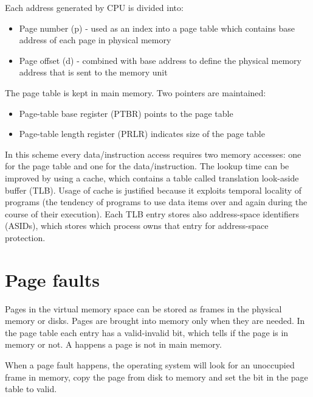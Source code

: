 
Each address generated by CPU is divided into:
\begin{itemize}
    \item Page number (p) - used as an index into a page table which contains base address of each page in physical memory
    \item Page offset (d) - combined with base address to define the physical memory address that is sent to the memory unit
\end{itemize}


The page table is kept in main memory. Two pointers are maintained:
\begin{itemize}
    \item Page-table base register (PTBR) points to the page table
    \item Page-table length register (PRLR) indicates size of the page table
\end{itemize}
In this scheme every data/instruction access requires two memory accesses: one for the page table and one for the data/instruction. The lookup time can be improved by using a cache, which contains a table called translation look-aside buffer (TLB). Usage of cache is justified because it exploits temporal locality of programs (the tendency of programs to use data items over and again during the course of their execution). Each TLB entry stores also address-space identifiers (ASIDs), which stores which process owns that entry for address-space protection.


\section{Page faults}

Pages in the virtual memory space can be stored as frames in the physical memory or disks. Pages are brought into memory only when they are needed. In the page table each entry has a valid-invalid bit, which tells if the page is in memory or not. A  happens a page is not in main memory.


When a page fault happens, the operating system will look for an unoccupied frame in memory, copy the page from disk to memory and set the bit in the page table to valid.

